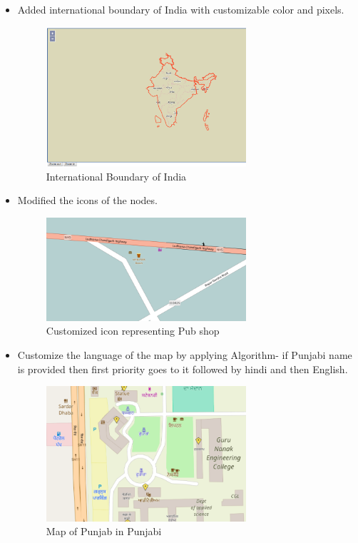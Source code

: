 \begin{itemize}
\begin{itemize}
\item Added international boundary of India with customizable color and pixels.
\begin{figure}[h!]
	\centering \includegraphics[width=0.7\textwidth]{input/images/osm_boundary.png}
	\caption{International Boundary of India}
\end{figure}

\item Modified the icons of the nodes.
\begin{figure}[h!]
	\centering \includegraphics[width=0.7\textwidth]{input/images/osm_icon.png}
	\caption{Customized icon representing Pub shop}
\end{figure}

\item Customize the language of the map by applying Algorithm- if Punjabi name is provided then first priority goes to it followed by hindi and then English.
\begin{figure}[h!]
	\centering \includegraphics[width=0.7\textwidth]{input/images/osm_language.png}
	\caption{Map of Punjab in Punjabi}
\end{figure}


\end{itemize}
\end{itemize}
